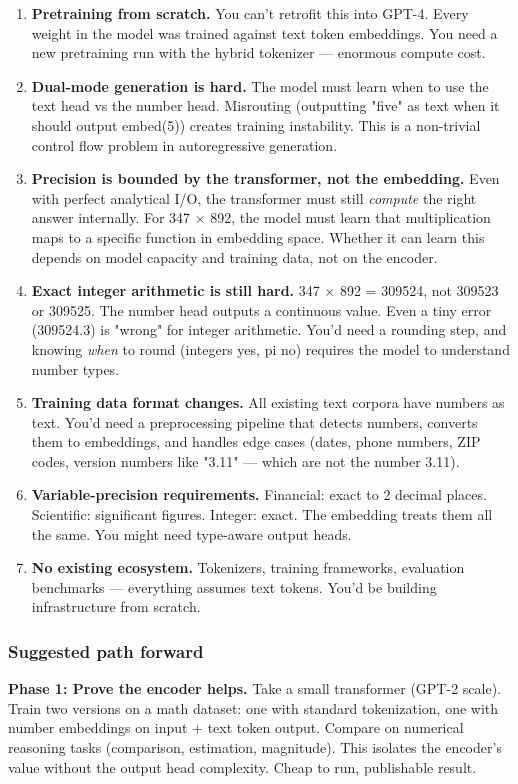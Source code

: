 \documentclass[11pt]{article}
\begin{document}
\begin{enumerate}
\item \textbf{Pretraining from scratch.} You can't retrofit this into GPT-4. Every weight in the model was trained against text token embeddings. You need a new pretraining run with the hybrid tokenizer — enormous compute cost.
\item \textbf{Dual-mode generation is hard.} The model must learn when to use the text head vs the number head. Misrouting (outputting "five" as text when it should output embed(5)) creates training instability. This is a non-trivial control flow problem in autoregressive generation.
\item \textbf{Precision is bounded by the transformer, not the embedding.} Even with perfect analytical I/O, the transformer must still \emph{compute} the right answer internally. For 347 × 892, the model must learn that multiplication maps to a specific function in embedding space. Whether it can learn this depends on model capacity and training data, not on the encoder.
\item \textbf{Exact integer arithmetic is still hard.} 347 × 892 = 309524, not 309523 or 309525. The number head outputs a continuous value. Even a tiny error (309524.3) is "wrong" for integer arithmetic. You'd need a rounding step, and knowing \emph{when} to round (integers yes, pi no) requires the model to understand number types.
\item \textbf{Training data format changes.} All existing text corpora have numbers as text. You'd need a preprocessing pipeline that detects numbers, converts them to embeddings, and handles edge cases (dates, phone numbers, ZIP codes, version numbers like "3.11" — which are not the number 3.11).
\item \textbf{Variable-precision requirements.} Financial: exact to 2 decimal places. Scientific: significant figures. Integer: exact. The embedding treats them all the same. You might need type-aware output heads.
\item \textbf{No existing ecosystem.} Tokenizers, training frameworks, evaluation benchmarks — everything assumes text tokens. You'd be building infrastructure from scratch.
\end{enumerate}


\subsubsection*{Suggested path forward}


\textbf{Phase 1: Prove the encoder helps.} Take a small transformer (GPT-2 scale). Train two versions on a math dataset: one with standard tokenization, one with number embeddings on input + text token output. Compare on numerical reasoning tasks (comparison, estimation, magnitude). This isolates the encoder's value without the output head complexity. Cheap to run, publishable result.
\end{document}

